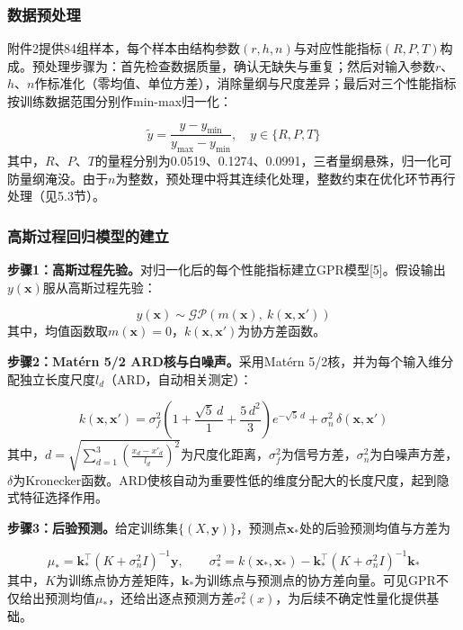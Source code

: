 \documentclass[withoutpreface]{cumcmthesis}
\begin{document}
\subsubsection{数据预处理}
附件2提供84组样本，每个样本由结构参数$(r,h,n)$与对应性能指标$(R,P,T)$构成。预处理步骤为：首先检查数据质量，确认无缺失与重复；然后对输入参数$r$、$h$、$n$作标准化（零均值、单位方差），消除量纲与尺度差异；最后对三个性能指标按训练数据范围分别作min-max归一化：

\begin{equation}
\tilde y=\frac{y-y_{\min}}{y_{\max}-y_{\min}},\quad y\in\{R,P,T\} \tag{1}
\end{equation}
其中，$R$、$P$、$T$的量程分别为0.0519、0.1274、0.0991，三者量纲悬殊，归一化可防量纲淹没。由于$n$为整数，预处理中将其连续化处理，整数约束在优化环节再行处理（见5.3节）。

\subsubsection{高斯过程回归模型的建立}
\textbf{步骤1：高斯过程先验。}对归一化后的每个性能指标建立GPR模型[5]。假设输出$y(\mathbf{x})$服从高斯过程先验：

\begin{equation}
y(\mathbf{x})\sim\mathcal{GP}\left(m(\mathbf{x}),\ k(\mathbf{x},\mathbf{x}')\right) \tag{2}
\end{equation}
其中，均值函数取$m(\mathbf{x})=0$，$k(\mathbf{x},\mathbf{x}')$为协方差函数。

\textbf{步骤2：Matérn 5/2 ARD核与白噪声。}采用Matérn 5/2核，并为每个输入维分配独立长度尺度$l_d$（ARD，自动相关测定）：

\begin{equation}
k(\mathbf{x},\mathbf{x}')=\sigma_f^2\left(1+\frac{\sqrt{5}\,d}{1}+\frac{5\,d^2}{3}\right)e^{-\sqrt{5}\,d}+\sigma_n^2\,\delta(\mathbf{x},\mathbf{x}') \tag{3}
\end{equation}
其中，$d=\sqrt{\sum_{d=1}^{3}\left(\frac{x_d-x'_d}{l_d}\right)^2}$为尺度化距离，$\sigma_f^2$为信号方差，$\sigma_n^2$为白噪声方差，$\delta$为Kronecker函数。ARD使核自动为重要性低的维度分配大的长度尺度，起到隐式特征选择作用。

\textbf{步骤3：后验预测。}给定训练集$\{(X,\mathbf{y})\}$，预测点$\mathbf{x}_*$处的后验预测均值与方差为

\begin{equation}
\mu_*=\mathbf{k}_*^{\top}(K+\sigma_n^2 I)^{-1}\mathbf{y},\qquad \sigma_*^2=k(\mathbf{x}_*,\mathbf{x}_*)-\mathbf{k}_*^{\top}(K+\sigma_n^2 I)^{-1}\mathbf{k}_* \tag{4}
\end{equation}
其中，$K$为训练点协方差矩阵，$\mathbf{k}_*$为训练点与预测点的协方差向量。可见GPR不仅给出预测均值$\mu_*$，还给出逐点预测方差$\sigma_*^2(x)$，为后续不确定性量化提供基础。
\end{document}

